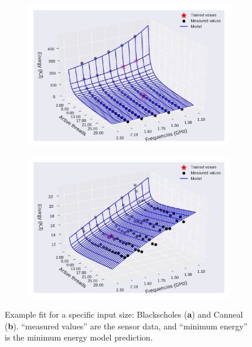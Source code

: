 \begin{figure}[H]
	\centering
	\captionsetup[subfigure]{justification=centering}
	\begin{subfigure}[b]{0.45\textwidth}
		\centerline{\includegraphics[width=\columnwidth]{models/figures/energy/freq_cores/completo_black_5.pdf}}
		\caption{}
		\label{fig:en_eq_black_fc}
	\end{subfigure}
	\begin{subfigure}[b]{0.45\textwidth}
		\centerline{\includegraphics[width=\columnwidth]{models/figures/energy/freq_cores/completo_canneal_1.pdf}}
		\caption{}
		\label{fig:en_eq_canneal_fc}
	\end{subfigure}
	
	\caption{Example fit for a specific input size: Blackscholes (\textbf{a}) and Canneal (\textbf{b}).  “measured values” are the sensor data, and “minimum energy” is the minimum energy model prediction.
	}
	\label{fig:en_eq_freq_cores_fc}
\end{figure}

